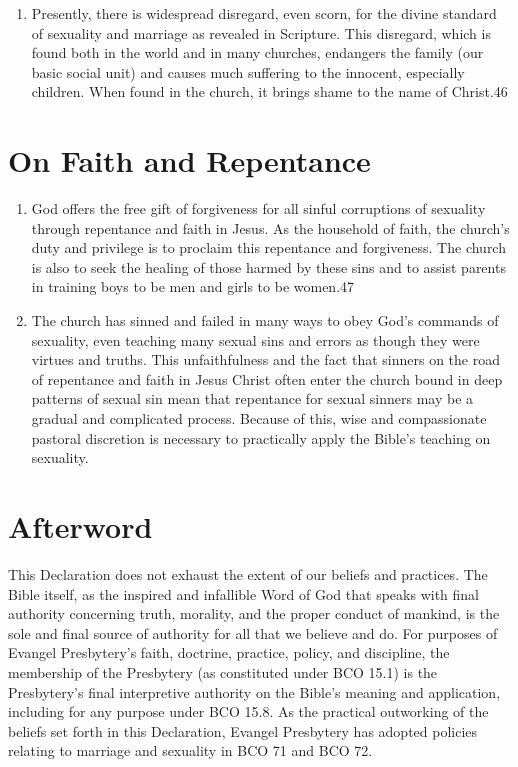 \documentclass[
]{book}
\begin{document}
\begin{enumerate}
\item
  Presently, there is widespread disregard, even scorn, for the divine standard of sexuality and marriage as revealed in Scripture. This disregard, which is found both in the world and in many churches, endangers the family (our basic social unit) and causes much suffering to the innocent, especially children. When found in the church, it brings shame to the name of Christ.46
\end{enumerate}

\hypertarget{on-faith-and-repentance}{%
\section*{On Faith and Repentance}\label{on-faith-and-repentance}}

\begin{enumerate}
\def\labelenumi{\arabic{enumi}.}
\setcounter{enumi}{15}
\item
  God offers the free gift of forgiveness for all sinful corruptions of sexuality through repentance and faith in Jesus. As the household of faith, the church's duty and privilege is to proclaim this repentance and forgiveness. The church is also to seek the healing of those harmed by these sins and to assist parents in training boys to be men and girls to be women.47
\item
  The church has sinned and failed in many ways to obey God's commands of sexuality, even teaching many sexual sins and errors as though they were virtues and truths. This unfaithfulness and the fact that sinners on the road of repentance and faith in Jesus Christ often enter the church bound in deep patterns of sexual sin mean that repentance for sexual sinners may be a gradual and complicated process. Because of this, wise and compassionate pastoral discretion is necessary to practically apply the Bible's teaching on sexuality.
\end{enumerate}

\hypertarget{afterword}{%
\section*{Afterword}\label{afterword}}

This Declaration does not exhaust the extent of our beliefs and practices. The Bible itself, as the inspired and infallible Word of God that speaks with final authority concerning truth, morality, and the proper conduct of mankind, is the sole and final source of authority for all that we believe and do. For purposes of Evangel Presbytery's faith, doctrine, practice, policy, and discipline, the membership of the Presbytery (as constituted under BCO 15.1) is the Presbytery's final interpretive authority on the Bible's meaning and application, including for any purpose under BCO 15.8. As the practical outworking of the beliefs set forth in this Declaration, Evangel Presbytery has adopted policies relating to marriage and sexuality in BCO 71 and BCO 72.
\end{document}
